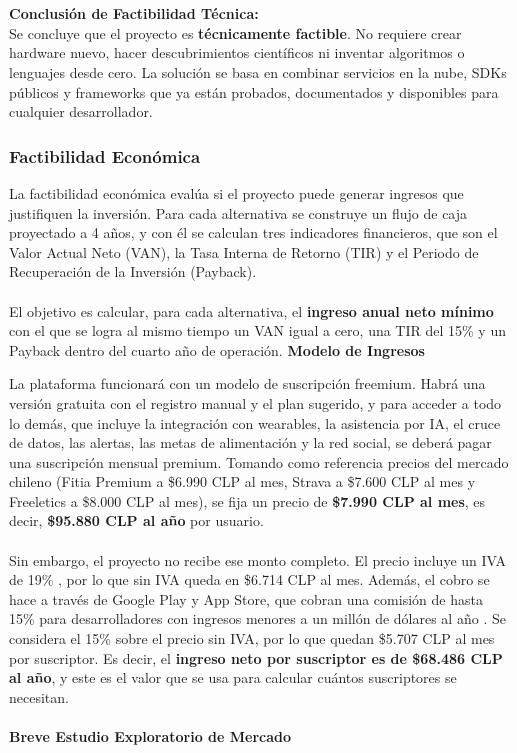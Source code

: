 \\\\
\textbf{Conclusión de Factibilidad Técnica:}\\
Se concluye que el proyecto es \textbf{técnicamente factible}. No requiere crear hardware nuevo, hacer descubrimientos científicos ni inventar algoritmos o lenguajes desde cero. La solución se basa en combinar servicios en la nube, SDKs públicos y frameworks que ya están probados, documentados y disponibles para cualquier desarrollador.

\subsubsection{Factibilidad Económica}
La factibilidad económica evalúa si el proyecto puede generar ingresos que justifiquen la inversión. Para cada alternativa se construye un flujo de caja proyectado a 4 años, y con él se calculan tres indicadores financieros, que son el Valor Actual Neto (VAN), la Tasa Interna de Retorno (TIR) y el Periodo de Recuperación de la Inversión (Payback).
\\\\
El objetivo es calcular, para cada alternativa, el \textbf{ingreso anual neto mínimo} con el que se logra al mismo tiempo un VAN igual a cero, una TIR del 15\% y un Payback dentro del cuarto año de operación.
\newpage
\textbf{Modelo de Ingresos}

La plataforma funcionará con un modelo de suscripción freemium. Habrá una versión gratuita con el registro manual y el plan sugerido, y para acceder a todo lo demás, que incluye la integración con wearables, la asistencia por IA, el cruce de datos, las alertas, las metas de alimentación y la red social, se deberá pagar una suscripción mensual premium. Tomando como referencia precios del mercado chileno (Fitia Premium a \$6.990 CLP al mes, Strava a \$7.600 CLP al mes y Freeletics a \$8.000 CLP al mes), se fija un precio de \textbf{\$7.990 CLP al mes}, es decir, \textbf{\$95.880 CLP al año} por usuario.
\\\\
Sin embargo, el proyecto no recibe ese monto completo. El precio incluye un IVA de 19\% \citep{sii_iva_digital}, por lo que sin IVA queda en \$6.714 CLP al mes. Además, el cobro se hace a través de Google Play y App Store, que cobran una comisión de hasta 15\% para desarrolladores con ingresos menores a un millón de dólares al año \citep{apple_small_business, google_service_fees}. Se considera el 15\% sobre el precio sin IVA, por lo que quedan \$5.707 CLP al mes por suscriptor. Es decir, el \textbf{ingreso neto por suscriptor es de \$68.486 CLP al año}, y este es el valor que se usa para calcular cuántos suscriptores se necesitan.
\\\\
\textbf{Breve Estudio Exploratorio de Mercado}

